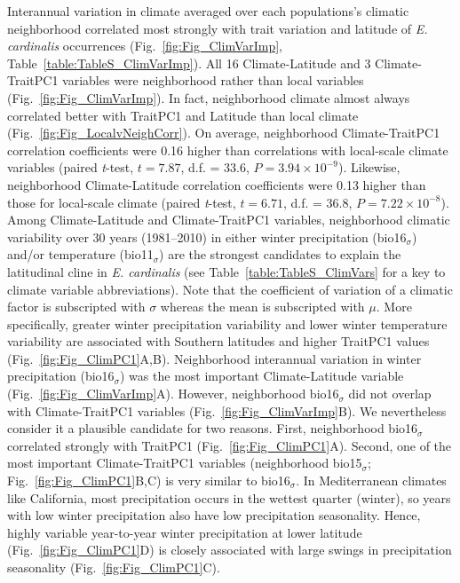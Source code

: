\documentclass[11pt, oneside]{article}
\begin{document}
Interannual variation in climate averaged over each populations's climatic neighborhood correlated most strongly with trait variation and latitude of \textit{E. cardinalis} occurrences (Fig.~\ref{fig:Fig_ClimVarImp}, Table~\ref{table:TableS_ClimVarImp}). All 16 Climate-Latitude and 3 Climate-TraitPC1 variables were neighborhood rather than local variables (Fig.~\ref{fig:Fig_ClimVarImp}). In fact, neighborhood climate almost always correlated better with TraitPC1 and Latitude than local climate (Fig.~\ref{fig:Fig_LocalvNeighCorr}). On average, neighborhood Climate-TraitPC1 correlation coefficients were 0.16 higher than correlations with local-scale climate variables (paired \textit{t}-test, $t = 7.87$, d.f. = 33.6, $P = 3.94 \times 10 ^ {-9}$). Likewise, neighborhood Climate-Latitude correlation coefficients were 0.13 higher than those for local-scale climate (paired \textit{t}-test, $t = 6.71$, d.f. = 36.8, $P = 7.22 \times 10 ^ {-8}$). 
Among Climate-Latitude and Climate-TraitPC1 variables, neighborhood climatic variability over 30 years (1981--2010) in either winter precipitation (bio16$_\sigma$) and/or temperature (bio11$_\sigma$) are the strongest candidates to explain the latitudinal cline in \textit{E. cardinalis} (see Table~\ref{table:TableS_ClimVars} for a key to climate variable abbreviations). Note that the coefficient of variation of a climatic factor is subscripted with $\sigma$ whereas the mean is subscripted with $\mu$. More specifically, greater winter precipitation variability and lower winter temperature variability are associated with Southern latitudes and higher TraitPC1 values (Fig.~\ref{fig:Fig_ClimPC1}A,B). Neighborhood interannual variation in winter precipitation (bio16$_\sigma$) was the most important Climate-Latitude variable (Fig.~\ref{fig:Fig_ClimVarImp}A). However, neighborhood bio16$_\sigma$ did not overlap with Climate-TraitPC1 variables (Fig.~\ref{fig:Fig_ClimVarImp}B). We nevertheless consider it a plausible candidate for two reasons. First, neighborhood bio16$_\sigma$ correlated strongly with TraitPC1 (Fig.~\ref{fig:Fig_ClimPC1}A). Second, one of the most important Climate-TraitPC1 variables (neighborhood bio15$_\sigma$; Fig.~\ref{fig:Fig_ClimPC1}B,C) is very similar to bio16$_\sigma$. In Mediterranean climates like California, most precipitation occurs in the wettest quarter (winter), so years with low winter precipitation also have low precipitation seasonality. Hence, highly variable year-to-year winter precipitation at lower latitude (Fig.~\ref{fig:Fig_ClimPC1}D) is closely associated with large swings in precipitation seasonality (Fig.~\ref{fig:Fig_ClimPC1}C). 
\end{document}

